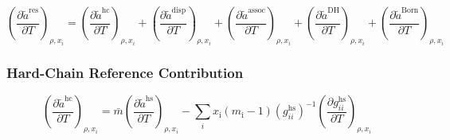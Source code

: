 \documentclass[12pt, letterpaper]{article}
\begin{document}

\begin{equation}
    \left(\frac{\partial\tilde{a}^\mathrm{res}}{\partial T}\right)_{\rho,x_{i}} =\left(\frac{\partial\tilde{a}^\mathrm{hc}}{\partial T}\right)_{\rho,x_{i}} +\left(\frac{\partial\tilde{a}^\mathrm{disp}}{\partial T}\right)_{\rho,x_{i}}
    +\left(\frac{\partial\tilde{a}^\mathrm{assoc}}{\partial T}\right)_{\rho,x_{i}}
    +\left(\frac{\partial\tilde{a}^\mathrm{DH}}{\partial T}\right)_{\rho,x_{i}}
    +\left(\frac{\partial\tilde{a}^\mathrm{Born}}{\partial T}\right)_{\rho,x_{i}}
    \label{eq:dares_dT}
\end{equation}

\subsubsection{Hard-Chain Reference Contribution}


\begin{equation}
    \left(\frac{\partial\tilde{a}^{\mathrm{hc}}}{\partial T}\right)_{\rho,x_{i}}=\bar{m}\left(\frac{\partial\tilde{a}^{\mathrm{hs}}}{\partial T}\right)_{\rho,x_{i}}-\sum_{i}x_{\mathrm{i}}(m_{\mathrm{i}}-1)(g_{ii}^{\mathrm{hs}})^{-1}\left(\frac{\partial g_{ii}^{\mathrm{hs}}}{\partial T}\right)_{\rho,x_{i}}
    \label{eq:dares_hc_dT}
\end{equation}

\end{document}
